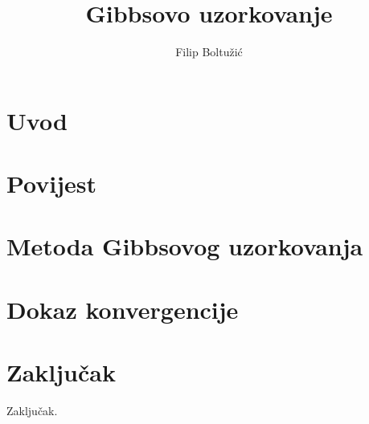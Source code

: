 \documentclass[times, utf8, seminar]{fer}
\begin{document}

\title{Gibbsovo uzorkovanje}

\author{Filip Boltužić}
\maketitle

\tableofcontents

\chapter{Uvod}

\chapter{Povijest}


\chapter{Metoda Gibbsovog uzorkovanja}


\chapter{Dokaz konvergencije}


\chapter{Zaključak}
Zaključak.



\end{document}
